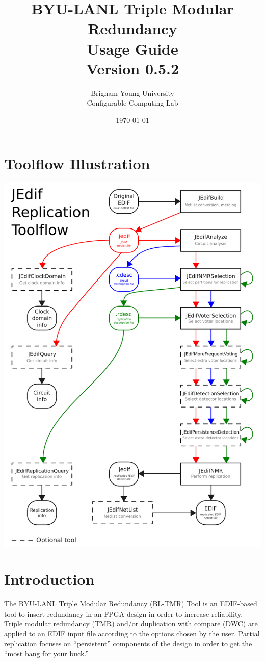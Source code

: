 \documentclass[english]{article}
\title{BYU-LANL Triple Modular Redundancy \\ Usage Guide \\ Version 0.5.2 }
\author{Brigham Young University \\ Configurable Computing Lab}
\date{\today}
\numberwithin{figure}{section}
\begin{document}
\maketitle

\newpage
\tableofcontents
\newpage

\section{Toolflow Illustration}
\includegraphics[scale=0.7]{tool_flow.pdf}
\newpage


\section{Introduction}
The BYU-LANL Triple Modular Redundancy (BL-TMR) Tool is an EDIF-based
tool to insert redundancy in an FPGA design in order to increase
reliability. Triple modular redundancy (TMR) and/or duplication with
compare (DWC) are applied to an EDIF input file according to the
options chosen by the user. Partial replication focuses on ``persistent''
components of the design in order to get the ``most bang for your buck.''
\end{document}
